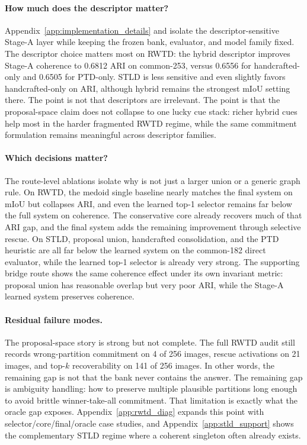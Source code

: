 \paragraph{How much does the descriptor matter?} Appendix~\ref{app:implementation_details} and  isolate the descriptor-sensitive Stage-A layer while keeping the frozen bank, evaluator, and model family fixed. The descriptor choice matters most on RWTD: the hybrid descriptor improves Stage-A coherence to 0.6812 ARI on common-253, versus 0.6556 for handcrafted-only and 0.6505 for PTD-only. STLD is less sensitive and even slightly favors handcrafted-only on ARI, although hybrid remains the strongest mIoU setting there. The point is not that descriptors are irrelevant. The point is that the proposal-space claim does not collapse to one lucky cue stack: richer hybrid cues help most in the harder fragmented RWTD regime, while the same commitment formulation remains meaningful across descriptor families.

\paragraph{Which decisions matter?} The route-level ablations isolate why \sys{} is not just a larger union or a generic graph rule. On RWTD, the medoid single baseline nearly matches the final system on mIoU but collapses ARI, and even the learned top-1 selector remains far below the full system on coherence. The conservative core already recovers much of that ARI gap, and the final system adds the remaining improvement through selective rescue. On STLD, proposal union, handcrafted consolidation, and the PTD heuristic are all far below the learned system on the common-182 direct evaluator, while the learned top-1 selector is already very strong. The supporting bridge route shows the same coherence effect under its own invariant metric: proposal union has reasonable overlap but very poor ARI, while the Stage-A learned system preserves coherence.



\paragraph{Residual failure modes.} The proposal-space story is strong but not complete. The full RWTD audit still records wrong-partition commitment on 4 of 256 images, rescue activations on 21 images, and top-$k$ recoverability on 141 of 256 images. In other words, the remaining gap is not that the bank never contains the answer. The remaining gap is ambiguity handling: how to preserve multiple plausible partitions long enough to avoid brittle winner-take-all commitment. That limitation is exactly what the oracle gap exposes. Appendix~\ref{app:rwtd_diag} expands this point with selector/core/final/oracle case studies, and Appendix~\ref{app:stld_support} shows the complementary STLD regime where a coherent singleton often already exists.
